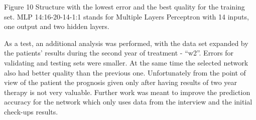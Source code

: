 \documentclass[10pt,oneside]{memoir}
\begin{document}
\begin{figure}
\begin{center}
\end{center}
\label{figure10}
\end{figure}

Figure 10 Structure with the lowest error and the best quality for the training set. MLP 14:16-20-14-1:1 stands for Multiple Layers Perceptron with 14 inputs, one output and two hidden layers.


As a test, an additional analysis was performed, with the data set expanded by the patients' results during the second year of treatment - ``w2''. Errors for validating and testing sets were smaller. At the same time the selected network also had better quality than the previous one. Unfortunately from the point of view of the patient the prognosis given only after having results of two year therapy is not very valuable. Further work was meant to improve the prediction accuracy for the network which only uses data from the interview and the initial check-ups results.
\end{document}
